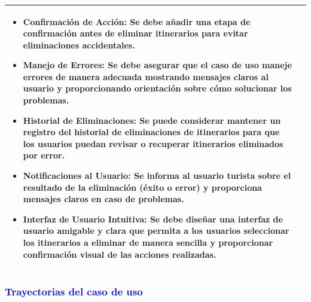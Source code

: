 \begin{tabularx}{16cm}{||l|X||}
\begin{itemize}
        \item Confirmación de Acción: Se debe añadir una etapa de confirmación antes de eliminar itinerarios para evitar eliminaciones accidentales.
        \item Manejo de Errores: Se debe asegurar que el caso de uso maneje errores de manera adecuada mostrando mensajes claros al usuario y proporcionando orientación sobre cómo solucionar los problemas.
        \item Historial de Eliminaciones: Se puede considerar mantener un registro del historial de eliminaciones de itinerarios para que los usuarios puedan revisar o recuperar itinerarios eliminados por error.
        \item Notificaciones al Usuario: Se informa al usuario turista sobre el resultado de la eliminación (éxito o error) y proporciona mensajes claros en caso de problemas.
        \item Interfaz de Usuario Intuitiva: Se debe diseñar una interfaz de usuario amigable y clara que permita a los usuarios seleccionar los itinerarios a eliminar de manera sencilla y proporcionar confirmación visual de las acciones realizadas.
    \end{itemize}\\
	\hline
\end{tabularx}
\vspace{300pt}
\subsubsection{\textcolor{blue}{Trayectorias del caso de uso}}


